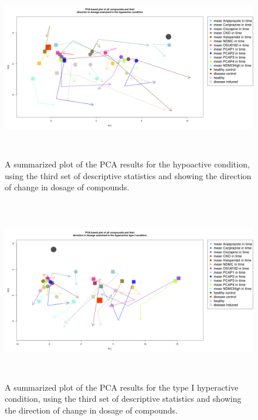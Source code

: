 \documentclass[a4paper,12pt]{article}
\begin{document}
\begin{figure}[h!]
\begin{center}
\includegraphics[width=16cm,height=8cm]{All_together_doses_DarkApoLowset3_NM.png}
\caption{A summarized plot of the PCA results for the hypoactive condition, using the third set of descriptive statistics and showing the direction of change in dosage of compounds.}
\end{center}
\end{figure}
\newpage

\begin{figure}[h!]
\begin{center}
\includegraphics[width=16cm,height=8cm]{All_together_doses_DarkApoHighset3_NM.png}
\caption{A summarized plot of the PCA results for the type I hyperactive condition, using the third set of descriptive statistics and showing the direction of change in dosage of compounds.}
\end{center}
\end{figure}
\newpage
\end{document}
